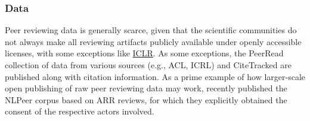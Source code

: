 \subsubsection{Data}
Peer reviewing data is generally scarce, given that the scientific communities do not always make all reviewing artifacts publicly available under openly accessible licenses, with some exceptions like \href{https://iclr.cc}{ICLR}. %
As some exceptions, 
the PeerRead \cite{kang-etal-2018-dataset} collection of data from various sources (e.g., ACL, ICRL) and CiteTracked \cite{Plank2019CiteTrackedAL} %
are 
published along with citation information. %
As a prime example of how larger-scale open publishing of raw peer reviewing data may work, \citet{dycke-etal-2023-nlpeer} recently published the NLPeer corpus based on ARR reviews, for which they explicitly obtained the consent of the respective actors involved. 
%
%
%
